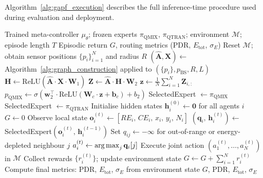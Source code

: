 Algorithm~\ref{alg:gapf_execution} describes the full inference-time procedure used during evaluation and deployment.

\begin{algorithm}[H]
\caption{GAPF Episode Execution --- Pseudocode (Inference)}
\label{alg:gapf_execution}
\begin{algorithmic}[1]
\REQUIRE Trained meta-controller $\mu_\theta$; frozen experts $\pi_{\text{QMIX}}$, $\pi_{\text{QTRAN}}$; environment $\mathcal{M}$; episode length $T$
\ENSURE Episodic return $G$, routing metrics (PDR, $E_{\text{tot}}$, $\sigma_E$)
\STATE {}
\STATE Reset $\mathcal{M}$; obtain sensor positions $\{p_i\}_{i=1}^N$ and radius $R$
\STATE $(\hat{\mathbf{A}}, \mathbf{X}) \leftarrow$ Algorithm~\ref{alg:graph_construction} applied to $(\{p_i\}, p_{\text{BS}}, R, L)$
\STATE $\mathbf{H} \leftarrow \text{ReLU}(\hat{\mathbf{A}} \cdot \mathbf{X} \cdot \mathbf{W}_1)$ 
\STATE $\mathbf{Z} \leftarrow \hat{\mathbf{A}} \cdot \mathbf{H} \cdot \mathbf{W}_2$ 
\STATE $\mathbf{z} \leftarrow \frac{1}{N} \sum_{i=1}^{N} \mathbf{Z}_{i,:}$ 
\STATE {}
\STATE $p_{\text{QMIX}} \leftarrow \sigma\!\left(\mathbf{w}_2^\top \cdot \text{ReLU}(\mathbf{W}_c \cdot \mathbf{z} + \mathbf{b}_c) + b_2\right)$ 
    \STATE SelectedExpert $\leftarrow \pi_{\text{QMIX}}$
\ELSE
    \STATE SelectedExpert $\leftarrow \pi_{\text{QTRAN}}$
\ENDIF
\STATE {}
\STATE Initialise hidden states $\mathbf{h}_i^{(0)} \leftarrow \mathbf{0}$ for all agents $i$
\STATE $G \leftarrow 0$
        \STATE Observe local state $\mathbf{o}_i^{(t)} \leftarrow [RE_i,\, CE_i,\, x_i,\, y_i,\, N_i]$ 
        \STATE $(\mathbf{q}_i,\, \mathbf{h}_i^{(t)}) \leftarrow$ SelectedExpert$(\mathbf{o}_i^{(t)},\, \mathbf{h}_i^{(t-1)})$ 
        \STATE Set $q_{ij} \leftarrow -\infty$ for out-of-range or energy-depleted neighbour $j$ 
        \STATE $a_i^{(t)} \leftarrow \operatorname*{arg\,max}_j \mathbf{q}_i[j]$ 
    \ENDFOR
    \STATE Execute joint action $(a_1^{(t)}, \ldots, a_N^{(t)})$ in $\mathcal{M}$
    \STATE Collect rewards $\{r_i^{(t)}\}$; update environment state
    \STATE $G \leftarrow G + \sum_{i=1}^{N} r_i^{(t)}$
\ENDFOR
\STATE Compute final metrics: PDR, $E_{\text{tot}}$, $\sigma_E$ from environment state
\RETURN $G$, PDR, $E_{\text{tot}}$, $\sigma_E$
\end{algorithmic}
\end{algorithm}


